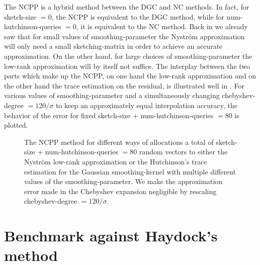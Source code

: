 The \gls{NCPP} is a hybrid method between the \gls{DGC} and \gls{NC} methods.
In fact, for \gls{sketch-size} $=0$, the \gls{NCPP} is equivalent to the \gls{DGC}
method, while for \gls{num-hutchinson-queries} $=0$, it is equivalent to the \gls{NC} method.
Back in  we already saw that for small values of \gls{smoothing-parameter}
the Nystr\"om approximation will only need a small \gls{sketching-matrix} in order
to achieve an accurate approximation. On the other hand, for large choices of
\gls{smoothing-parameter} the low-rank approximation will by itself not suffice.
The interplay between the two parts which make up the \gls{NCPP},
on one hand the low-rank approximation and on the other hand the
trace estimation on the residual, is illustrated well in
.
For various values of \gls{smoothing-parameter} and a simultaneously changing
\gls{chebyshev-degree} $=120 / \sigma$ to keep an approximately equal interpolation
accuracy, the behavior of the error for fixed \gls{sketch-size} $+$ \gls{num-hutchinson-queries} $=80$ is plotted.

\begin{figure}[ht]
    \centering
    
    \caption{The \gls{NCPP} method for different ways of allocations a 
    total of \gls{sketch-size} $+$ \gls{num-hutchinson-queries} $=80$ random vectors
    to either the Nystr\"om low-rank approximation or the Hutchinson's trace estimation
    for the Gaussian \gls{smoothing-kernel} with multiple different values of
    the \gls{smoothing-parameter}. We make the approximation error made in the
    Chebyshev expansion negligible by rescaling \gls{chebyshev-degree} $=120 / \sigma$.}
    \label{fig:5-experiments-electronic-structure-matvec-mixture}
\end{figure}


\clearpage
\section{Benchmark against Haydock's method}
\label{sec:5-experiments-haydock-method}

